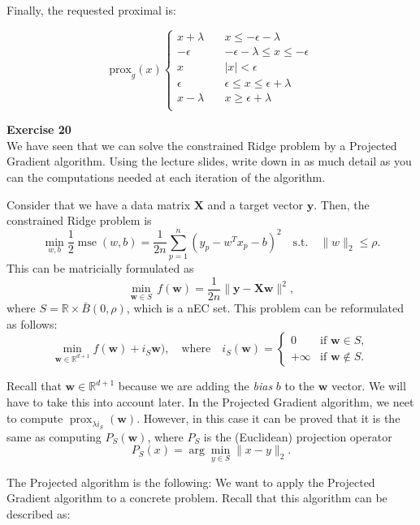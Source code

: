 \documentclass[11pt,table]{article}
\newenvironment{problem}[2][Exercise]
{ \begin{mdframed}[backgroundcolor=gray!20] \textbf{#1 #2} \\}
	{  \end{mdframed}}
\newcommand\R{\mathbb R}
\begin{document}
Finally, the requested proximal is:

\[
	\text{prox}_g(x) \begin{cases}
		x + \lambda \quad & x \le -\epsilon-\lambda               \\
		-\epsilon \quad   & -\epsilon-\lambda \le x \le -\epsilon \\
		x \quad           & |x| < \epsilon                        \\
		\epsilon \quad    & \epsilon \le x \le \epsilon+\lambda   \\
		x-\lambda \quad   & x \ge \epsilon+\lambda                \\
	\end{cases}
\]

\begin{problem}{20}
We have seen that we can solve the constrained Ridge problem by a Projected Gradient algorithm. Using the lecture slides, write down in as much detail as you can the computations needed at each iteration of the algorithm.
\end{problem}

Consider that we have a data matrix \(\mathbf{X}\) and a target vector \(\mathbf{y}\). Then, the constrained Ridge problem is
\[
	\min_{w,b}\frac{1}{2} \operatorname{mse}(w,b)= \frac{1}{2n}\sum_{p=1}^n (y_p-w^Tx_p-b)^2 \quad \text{s.t.} \quad \|w\|_2\leq \rho.
\]
This can be matricially formulated as
\[
	\min_{\mathbf{w}\in S} \, f(\mathbf{ w})=\frac{1}{2n}\|\mathbf{y} - \mathbf{Xw}\|^2,
\]
where $S=\mathbb R \times \bar B(0, \rho)$, which is a nEC set. This problem can be reformulated as follows:
\[
	\min_{\mathbf{w} \in \mathbb R^{d+1}} f(\mathbf{w}) + i_S\mathbf{w}), \quad \text{where} \quad i_S(\mathbf{w})=\begin{cases}0 & \text{if } \mathbf{w}\in S,\\ +\infty & \text{if } \mathbf{w} \notin S.\end{cases}
\]

Recall that \(\mathbf{w}\in \R^{d+1}\) because we are adding the \emph{bias} \(b\) to the \(\mathbf{w}\) vector. We will have to take this into account later. In the Projected Gradient algorithm, we neet to compute  $\operatorname{prox}_{\lambda i_S}(\mathbf{w})$. However, in this case it can be proved that it is the same as computing $P_S(\mathbf{w})$, where $P_S$ is the (Euclidean) projection operator
\[
	P_S(x)=\arg\min_{y\in S} \|x-y\|_2.
\]

The Projected algorithm is the following:
We want to apply the Projected Gradient algorithm to a concrete problem. Recall that this algorithm can be described as:
\end{document}

